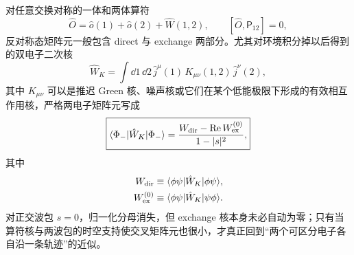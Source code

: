 对任意交换对称的一体和两体算符
\[
\hat O
=
\hat o(1)+\hat o(2)+\hat W(1,2),
\qquad
[\hat O,\mathsf P_{12}]=0,
\]
反对称态矩阵元一般包含 direct 与 exchange 两部分。尤其对环境积分掉以后得到的双电子二次核
\[
\hat W_K
=
\int\dd1\,\dd2\,
\hat j^\mu(1)\,
K_{\mu\nu}(1,2)\,
\hat j^\nu(2),
\]
其中 $K_{\mu\nu}$ 可以是推迟 Green 核、噪声核或它们在某个低能极限下形成的有效相互作用核，严格两电子矩阵元写成
\begin{equation}
\boxed{
\langle\Phi_-|\hat W_K|\Phi_-\rangle
=
\frac{
W_{\rm dir}-\operatorname{Re}W_{\rm ex}^{(0)}
}{
1-|s|^2},
}
\label{eq:two_electron_direct_exchange_kernel}
\end{equation}
其中
\begin{align*}
W_{\rm dir}
&\equiv
\langle\phi\psi|\hat W_K|\phi\psi\rangle,\\
W_{\rm ex}^{(0)}
&\equiv
\langle\phi\psi|\hat W_K|\psi\phi\rangle.
\end{align*}
对正交波包 $s=0$，归一化分母消失，但 exchange 核本身未必自动为零；只有当算符核与两波包的时空支持使交叉矩阵元也很小，才真正回到“两个可区分电子各自沿一条轨迹”的近似。

